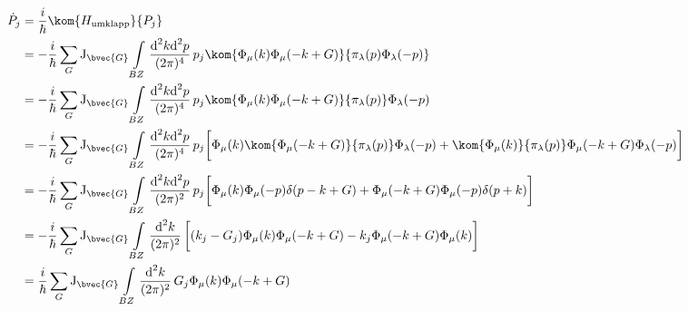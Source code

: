 %
\begin{align}
	\dot{P}_{j} &= \frac{i}{\hbar} \kom{H_{\text{umklapp}}}{P_{j}}
	\notag \\
	&= -\frac{i}{\hbar} \sum\limits_{G} \mathrm{J}_{\bvec{G}} 
		\int\limits_{BZ} \frac{\text{d}^{2}k \text{d}^{2}p}{(2\pi)^{4}} \, 
		p_{j}
		\kom{\Phi_{\mu}(k) \Phi_{\mu}(-k+G)}{\pi_{\lambda}(p) \Phi_{\lambda}(-p)}
	\notag \\
	&= -\frac{i}{\hbar} \sum\limits_{G} \mathrm{J}_{\bvec{G}} 
		\int\limits_{BZ} \frac{\text{d}^{2}k \text{d}^{2}p}{(2\pi)^{4}} \, 
		p_{j}
		\kom{\Phi_{\mu}(k) \Phi_{\mu}(-k+G)}{\pi_{\lambda}(p)} \Phi_{\lambda}(-p)
	\notag \\
	&= -\frac{i}{\hbar} \sum\limits_{G} \mathrm{J}_{\bvec{G}} 
		\int\limits_{BZ} \frac{\text{d}^{2}k \text{d}^{2}p}{(2\pi)^{4}} \, 
		p_{j} \bigg[
			\Phi_{\mu}(k) \kom{\Phi_{\mu}(-k+G)}{\pi_{\lambda}(p)} \Phi_{\lambda}(-p)
			+
			\kom{\Phi_{\mu}(k)}{\pi_{\lambda}(p)} \Phi_{\mu}(-k+G) \Phi_{\lambda}(-p)
		\bigg]
	\notag \\
	&= -\frac{i}{\hbar} \sum\limits_{G} \mathrm{J}_{\bvec{G}} 
		\int\limits_{BZ} \frac{\text{d}^{2}k \text{d}^{2}p}{(2\pi)^{2}} \, 
		p_{j} \bigg[
			\Phi_{\mu}(k) \Phi_{\mu}(-p) \delta(p-k+G)
			+
			\Phi_{\mu}(-k+G) \Phi_{\mu}(-p) \delta(p+k)
		\bigg]
	\notag \\
	&= -\frac{i}{\hbar} \sum\limits_{G} \mathrm{J}_{\bvec{G}} 
		\int\limits_{BZ} \frac{\text{d}^{2}k}{(2\pi)^{2}} \, 
		\bigg[
			(k_{j} - G_{j}) \Phi_{\mu}(k) \Phi_{\mu}(-k+G)
			-
			k_{j} \Phi_{\mu}(-k+G) \Phi_{\mu}(k)
		\bigg]
	\notag \\
	&= \frac{i}{\hbar} \sum\limits_{G} \mathrm{J}_{\bvec{G}} 
		\int\limits_{BZ} \frac{\text{d}^{2}k}{(2\pi)^{2}} \, 
			G_{j} \Phi_{\mu}(k) \Phi_{\mu}(-k+G)
\end{align}
%




































